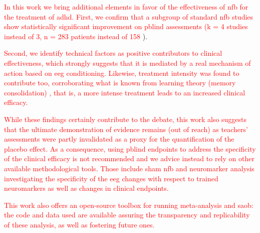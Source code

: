 \textcolor{red}{In this work we bring additional elements in favor of the effectiveness of \gls{nfb} for the treatment of \gls{adhd}. First, 
we confirm that a subgroup of standard \gls{nfb} studies show statistically significant improvement on \gls{pblind} 
assessments (k = 4 studies instead of 3, n = 283 patients instead of 158} \citet{Cortese2016}). 

\textcolor{red}{Second, we identify technical factors as positive contributors to clinical effectiveness, which strongly suggests 
that it is mediated by a real mechanism of action based on \gls{eeg} conditioning. Likewise, treatment intensity was found to 
contribute too, corroborating what is known from learning theory (memory consolidation)} \citep{Mowrer1960}\textcolor{red}{, that is, a more intense treatment leads to 
an increased clinical efficacy.}

\textcolor{red}{While these findings certainly contribute to the debate, this work also suggests that the ultimate demonstration of evidence 
remains (out of reach) as teachers’ assessments were partly invalidated as a proxy for the quantification of the placebo effect. 
As a consequence, using \gls{pblind} endpoints to address the specificity of the clinical efficacy is not recommended 
and we advice instead to rely on other available methodological tools. Those include sham \gls{nfb} and neuromarker 
analysis investigating the specificity of the \gls{eeg} changes with respect to trained neuromarkers as well as changes 
in clinical endpoints.}

\textcolor{red}{This work also offers an open-source toolbox for running meta-analysis and \gls{saob}: the code and data used are available 
assuring the transparency and replicability of these analysis, as well as fostering future ones.}


